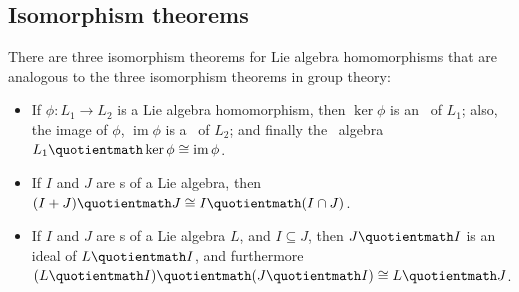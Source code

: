 {  \subsection*{Isomorphism theorems}
  
  There are three isomorphism theorems for Lie algebra homomorphisms
  that are analogous to the three isomorphism theorems in group
  theory:
  \begin{itemize}
  \item If $\phi\colon L_1\longrightarrow L_2$ is a Lie algebra
    homomorphism, then $\operatorname{ker}\phi$ is an \ideal\ of
    $L_1$; also, the image of $\phi$, $\operatorname{im}\phi$ is a
    \subalgebra\ of $L_2$; and finally the \quotient\ algebra
    $L_1\quotientmath\operatorname{ker}\phi\cong\operatorname{im}\phi$.
  \item If $I$ and $J$ are \ideal s of a Lie algebra, then
    $(I+J)\quotientmath J\cong I\quotientmath(I\cap J)$.
  \item If $I$ and $J$ are \ideal s of a Lie algebra $L$, and
    $I\subseteq J$, then $J\quotientmath I$ is an ideal of
    $L\quotientmath I$, and furthermore $(L\quotientmath
    I)\quotientmath (J\quotientmath I)\cong L\quotientmath J$.
  \end{itemize}
  
  \newpage
}
